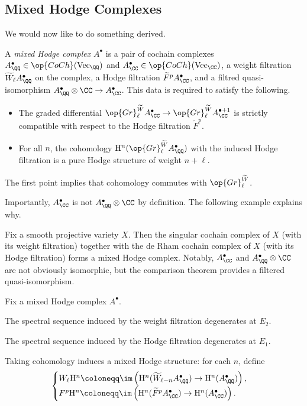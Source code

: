 \documentclass{article}
\begin{document}
\subsection{Mixed Hodge Complexes}
We would now like to do something derived.
\begin{definition}
	A \textit{mixed Hodge complex} $A^\bullet$ is a pair of cochain complexes $A^\bullet_\QQ\in\op{CoCh}(\mathrm{Vec}_\QQ)$ and $A^\bullet_\CC\in\op{CoCh}(\mathrm{Vec}_\CC)$, a weight filtration $\widetilde W_\ell A^\bullet_\QQ$ on the complex, a Hodge filtration $\widetilde F^pA^\bullet_\CC$, and a filtred quasi-isomorphism $A^\bullet_\QQ\otimes\CC\to A^\bullet_\CC$. This data is required to satisfy the following.
	\begin{itemize}
		\item The graded differential $\op{Gr}_\ell^{\widetilde W}A_\CC^\bullet\to\op{Gr}_\ell^{\widetilde W}A_\CC^{\bullet+1}$ is strictly compatible with respect to the Hodge filtration $\widetilde F^p$.
		\item For all $n$, the cohomology $\mathrm H^n(\op{Gr}_\ell^{\widetilde W}A^\bullet_\QQ)$ with the induced Hodge filtration is a pure Hodge structure of weight $n+\ell$.
	\end{itemize}
\end{definition}
\begin{remark}
	The first point implies that cohomology commutes with $\op{Gr}_\ell^{\widetilde W}$.
\end{remark}
\begin{remark}
	Importantly, $A^\bullet_\CC$ is not $A^\bullet_\QQ\otimes\CC$ by definition. The following example explains why.
\end{remark}
\begin{example}
	Fix a smooth projective variety $X$. Then the singular cochain complex of $X$ (with its weight filtration) together with the de Rham cochain complex of $X$ (with its Hodge filtration) forms a mixed Hodge complex. Notably, $A^\bullet_\CC$ and $A^\bullet_\QQ\otimes\CC$ are not obviously isomorphic, but the comparison theorem provides a filtered quasi-isomorphism.
\end{example}
\begin{theorem}
	Fix a mixed Hodge complex $A^\bullet$.
	\begin{listalph}
		\item The spectral sequence induced by the weight filtration degenerates at $E_2$.
		\item The spectral sequence induced by the Hodge filtration degenerates at $E_1$.
		\item Taking cohomology induces a mixed Hodge structure: for each $n$, define
		\[\begin{cases}
			W_\ell\mathrm H^n\coloneqq\im\left(\mathrm H^n(\widetilde W_{\ell-n}A^\bullet_\QQ)\to\mathrm H^n(A^\bullet_\QQ)\right), \\
			F^p\mathrm H^n\coloneqq\im\left(\mathrm H^n(\widetilde F^pA^\bullet_\CC)\to\mathrm H^n(A^\bullet_\CC)\right).
		\end{cases}\]
	\end{listalph}
\end{theorem}
\end{document}
